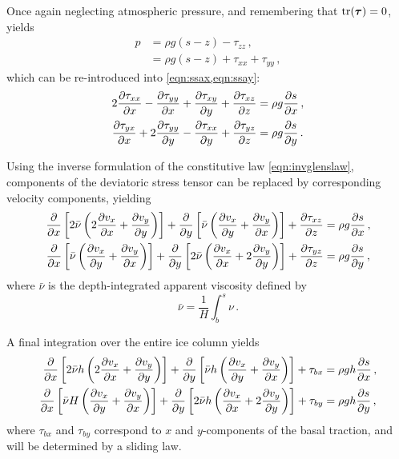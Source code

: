 \documentclass{article}
\newcommand{\tens}[1]{\vb*{#1}} %
\newcommand{\DST}[0]{\tens{\tau}}       %
\begin{document}
Once again neglecting atmospheric pressure, and remembering that $\tr(\DST)=0$,
 yields
\begin{align}
    p &= \rho g (s-z) - \tau_{zz} \,, \\
      &= \rho g (s-z) + \tau_{xx} + \tau_{yy} \,,
\end{align}
which can be re-introduced into \cref{eqn:ssax,eqn:ssay}:
\begin{subequations}
\begin{align}
    2\pdv{\tau_{xx}}{x} - \pdv{\tau_{yy}}{x} + \pdv{\tau_{xy}}{y}
        + \pdv{\tau_{xz}}{z} &= \rho g \pdv{s}{x} \,, \\
    \pdv{\tau_{yx}}{x} + 2\pdv{\tau_{yy}}{y} - \pdv{\tau_{xx}}{y}
        + \pdv{\tau_{yz}}{z} &= \rho g \pdv{s}{y} \,.
\end{align}
\end{subequations}

Using the inverse formulation of the constitutive law \eqref{eqn:invglenslaw},
components of the deviatoric stress tensor can be replaced by corresponding
velocity components, yielding
\begin{subequations}
\begin{align}
    \pdv{x} \left[2\bar{\nu}
                  \left(2\pdv{v_x}{x} + \pdv{v_y}{y}\right) \right]
        + \pdv{y} \left[\bar{\nu}
                        \left(\pdv{v_x}{y} + \pdv{v_y}{x}\right) \right]
        + \pdv{\tau_{xz}}{z} &= \rho g \pdv{s}{x} \,, \\
    \pdv{x} \left[\bar{\nu}
                  \left(\pdv{v_x}{y} + \pdv{v_y}{x}\right) \right]
        + \pdv{y} \left[2\bar{\nu}
                        \left(\pdv{v_x}{x} + 2\pdv{v_y}{y}\right) \right]
         + \pdv{\tau_{yz}}{z} &= \rho g \pdv{s}{y} \,,
\end{align}
\end{subequations}
where $\bar{\nu}$ is the depth-integrated apparent viscosity defined by
\begin{equation}
    \bar{\nu} = \frac{1}{H}\int_b^s\nu \,.
\end{equation}

A final integration over the entire ice column yields
\citep[Eqs.~7.7--7.8]{Weis.etal.1999}
\begin{subequations}
\begin{align}
    \label{eqn:vssa}
    \pdv{x} \left[2\bar{\nu}h
                  \left(2\pdv{v_x}{x} + \pdv{v_y}{y}\right) \right]
        + \pdv{y} \left[\bar{\nu}h
                        \left(\pdv{v_x}{y} + \pdv{v_y}{x}\right) \right]
        + \tau_{bx} &= \rho gh \pdv{s}{x} \,, \\
    \pdv{x} \left[\bar{\nu}H
                  \left(\pdv{v_x}{y} + \pdv{v_y}{x}\right) \right]
        + \pdv{y} \left[2\bar{\nu}h
                        \left(\pdv{v_x}{x} + 2\pdv{v_y}{y}\right) \right]
        + \tau_{by} &= \rho gh \pdv{s}{y} \,,
\end{align}
\end{subequations}
where $\tau_{bx}$ and $\tau_{by}$ correspond to $x$ and $y$-components of the
basal traction, and will be determined by a sliding law.
\end{document}
